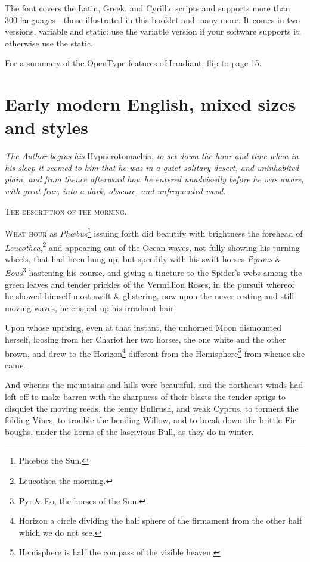 \documentclass[12pt]{book}
\begin{document}
The font covers the Latin, Greek, and Cyrillic scripts and supports
more than 300 languages---those illustrated in this booklet and many more. It
comes in two versions, variable and static: use the variable version
if your software supports it; otherwise use the static.

For a summary of the OpenType features of Irradiant, flip to page 15.


\section*{Early modern English, mixed sizes and styles}

\noindent\textit{The Author begins his} Hypnerotomachia, \textit{to set
  down the hour and time when in his sleep it seemed to him that
  he was in a quiet solitary desert, and uninhabited plain, and
  from thence afterward how he entered unadvisedly before he was
  aware, with great fear, into a dark, obscure, and unfrequented
  wood.}

\begin{center}
  \textsc{The description of the morning.}
\end{center}

\lettrine[lines=5, loversize=0.1, findent=5pt, nindent=0em, image=true]{W}{hat hour} as \textit{Phœbus}\footnote{Phœbus the Sun.} issuing
forth did beautify with brightness the forehead of
\textit{Leucothea},\footnote{Leucothea the morning.} and appearing out
of the Ocean waves, not fully showing his turning wheels, that had
been hung up, but speedily with his swift horses \textit{Pyrous} \&
\textit{Eous}\footnote{Pyr \& Eo, the horses of the Sun.} hastening
his course, and giving a tincture to the Spider’s webs among the
green leaves and tender prickles of the Vermillion Roses, in the
pursuit whereof he showed himself most swift \& glistering, now upon
the never resting and still moving waves, he crisped up his irradiant
hair.

Upon whose uprising, even at that instant, the unhorned Moon
dismounted herself, loosing from her Chariot her two horses, the one
white and the other brown, and drew to the Horizon\footnote{Horizon
  a circle dividing the half sphere of the firmament from the other
  half which we do not see.} different from the
Hemisphere\footnote{Hemisphere is half the compass of the visible
  heaven.} from whence she came.

And whenas the mountains and hills were beautiful, and the
northeast winds had left off to make barren with the sharpness of
their blasts the tender sprigs to disquiet the moving reeds, the
fenny Bullrush, and weak Cyprus, to torment the folding Vines, to
trouble the bending Willow, and to break down the brittle Fir
boughs, under the horns of the lascivious Bull, as they do in
winter.
\end{document}
